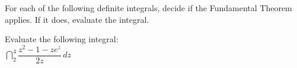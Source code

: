 \documentclass[10pt]{article}
\begin{document}
%




\exercise{}   For each of the following definite integrals, decide if the Fundamental Theorem applies.  If it does, evaluate the integral.\\


\exercise {}  Evaluate the following integral:\\

$\dint_2^4 \dfrac{z^2-1-ze^z}{2z}\,dz$



\end{document}
